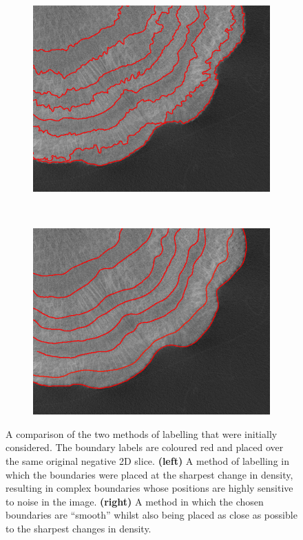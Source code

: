 \begin{figure}[t]
    \centering
    \begin{subfigure}[t]{0.49\textwidth}
        \centering
        \includegraphics[width=1\textwidth, valign=c]{images/rough-label.png}
    \end{subfigure}
    ~
    \begin{subfigure}[t]{0.49\textwidth}
        \centering
        \includegraphics[width=1\textwidth, valign=c]{images/smooth-label.png}
    \end{subfigure}
    \caption{A comparison of the two methods of labelling that were initially considered. The boundary labels are coloured red and placed over the same original negative 2D slice. \textbf{(left)} A method of labelling in which the boundaries were placed at the sharpest change in density, resulting in complex boundaries whose positions are highly sensitive to noise in the image. \textbf{(right)} A method in which the chosen boundaries are ``smooth'' whilst also being placed as close as possible to the sharpest changes in density.}
    \label{fig:labelstyle}
\end{figure}

